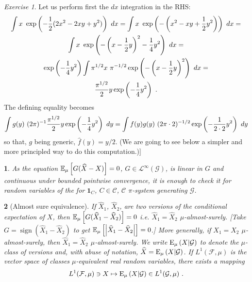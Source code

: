 \documentclass[12pt,a4paper]{amsart}
\newcommand{\one}{\bm 1}
\newcommand{\signof}[1]{\operatorname{sign}\left(#1\right)}
\theoremstyle{plain}%
\newtheorem{npar}{}%
\theoremstyle{definition}
\theoremstyle{remark}
\newtheorem{exercise}{Exercise}
\begin{document}
\begin{exercise}
Let us perform first the $dx$ integration in the RHS:
\begin{multline*}
  \int x \ \expof{-\frac12(2x^2 - 2xy + y^2)} \ dx =  \int x \ \expof{-\left(x^2 - xy + \frac12 y^2\right)} \ dx = \\  \int x \ \expof{-\left(x-\frac12 y\right)^2 - \frac14 y^2} \ dx = \\ \expof{-\frac14 y^2} \int \pi^{1/2} x \ \pi^{-1/2}\expof{-\left(x-\frac12 y\right)^2} \ dx = \\
 \frac {\pi^{1/2}}2 y \expof{-\frac14 y^2} \ . 
\end{multline*}
The defining equality becomes
\begin{equation*}
    \int g(y) \ (2\pi)^{-1} \frac {\pi^{1/2}}2 y \exp\left(-\frac14 y^2\right) \ dy = \int f(y)g(y) \ (2\pi \cdot 2)^{-1/2} \exp\left(-\frac 1 {2 \cdot 2} y^2\right) \ dy 
\end{equation*}
so that, $g$ being generic, $\hat f(y) = y/2$. (We are going to see below a simpler and more principled way to do this computation.)]
\end{exercise}

\begin{npar} \normalfont
As the equation $\operatorname{\mathbb E}_{\mu}\left[G(\widehat X - X)\right] = 0$, $G \in \mathcal L^\infty(\mathcal G)$, is linear in $G$ and continuous under bounded pointwise convergence, it is enough to check it for random variables of the for $\one_C$, $C \in \mathcal C$, $\mathcal C$ $\pi$-system generating $\mathcal G$.
\end{npar}

\begin{npar}[Almost sure equivalence] \normalfont If $\widehat X_1$, $\widehat X_2$, are two versions of the conditional expectation of $X$, then $\operatorname{\mathbb E}_{\mu}\left[G(\widehat X_1 - \widehat X_2)\right] = 0$ i.e. $\widehat X_1 = \widehat X_2$ $\mu$-almost-surely. [Take $G = \signof{\widehat X_1 - \widehat X_2}$ to get $\operatorname{\mathbb E}_{\mu}\left[\left\vert\widehat X_1 - \widehat X_2\right\vert\right] = 0$.] More generally, if $X_1 = X_2$ $\mu$-almost-surely, then $\widehat X_1 = \widehat X_2$ $\mu$-almost-surely. We write $\operatorname{E}_{\mu}\left(X \middle| \mathcal G\right)$ to denote the $\mu$-class of versions and, with abuse of notation, $\widehat X = \operatorname{E}_{\mu}\left(X \middle| \mathcal G\right)$. If $L^1(\mathcal F,\mu)$ is the vector space of classes $\mu$-equivalent real random variables, there exists a mapping
\begin{equation*}
  L^1(\mathcal F,\mu) \ni X \mapsto \operatorname{E}_{\mu}\left(X \middle| \mathcal G\right) \in L^1(\mathcal G,\mu) \ .
\end{equation*}
\end{npar}
\end{document}

